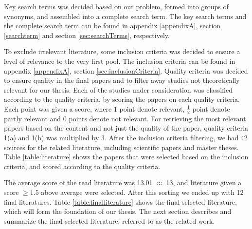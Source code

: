 Key search terms was decided based on our problem, formed into groups of synonyms, and assembled into a complete search term. The key search terms and the complete search term can be found in appendix \ref{appendixA}, section \vref{searchterm} and section \vref{sec:searchTerms}, respectively.

To exclude irrelevant literature, some inclusion criteria was decided to ensure a level of relevance to the very first pool. The inclusion criteria can be found in appendix \ref{appendixA}, section \vref{sec:inclusionCriteria}. Quality criteria was decided to ensure quality in the final papers and to filter away studies not theoretically relevant for our thesis. Each of the studies under consideration was classified according to the quality criteria, by scoring the papers on each quality criteria. Each point was given a score, where 1 point denote relevant, $\frac{1}{2}$ point denote partly relevant and 0 points denote not relevant. For retrieving the most relevant papers based on the content and not just the quality of the paper, quality criteria 1(a) and 1(b) was multiplied by 3. After the inclusion criteria filtering, we had 42 sources for the related literature, including scientific papers and master theses. Table \vref{table:literature} shows the papers that were selected based on the inclusion criteria, and scored according to the quality criteria. 

The average score of the read literature was 13.01 $\approx$ 13, and literature given a score $\geq{1.5}$ above average were selected. After this sorting we ended up with 12 final literatures. Table \vref{table:finalliterature} shows the final selected literature, which will form the foundation of our thesis. The next section describes and summarize the final selected literature, referred to as the related work.

